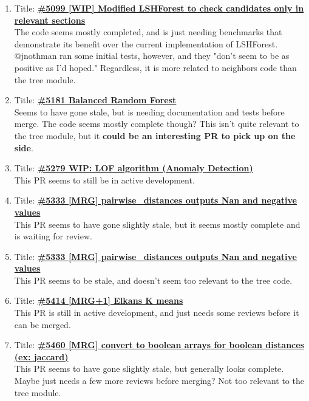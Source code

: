 \documentclass[12pt, oneside]{article}
\begin{document}
\begin{enumerate}
  \item
  Title:
  \textbf{\href{https://github.com/scikit-learn/scikit-learn/pull/5099}
    {\#5099 [WIP] Modified LSHForest to check candidates only in
      relevant sections}}\\
  The code seems mostly completed, and is just needing benchmarks that
  demonstrate its benefit over the current implementation of
  LSHForest. @jnothman ran some initial tests, however, and they
  "don't seem to be as positive as I'd hoped." Regardless, it is more
  related to neighbors code than the tree module.

  \item
  Title:
  \textbf{\href{https://github.com/scikit-learn/scikit-learn/pull/5181}
    {\#5181 Balanced Random Forest}}\\
  Seems to have gone stale, but is needing documentation and tests
  before merge. The code seems mostly complete though? This isn't
  quite relevant to the tree module, but it \textbf{could be an
    interesting PR to pick up on the side}.

  \item
  Title:
  \textbf{\href{https://github.com/scikit-learn/scikit-learn/pull/5279}
    {\#5279 WIP: LOF algorithm (Anomaly Detection)}}\\
  This PR seems to still be in active development.

  \item
  Title:
  \textbf{\href{https://github.com/scikit-learn/scikit-learn/pull/5333}
    {\#5333 [MRG] pairwise\_distances outputs Nan and negative values}}\\
  This PR seems to have gone slightly stale, but it seems mostly
  complete and is waiting for review.

  \item
  Title:
  \textbf{\href{https://github.com/scikit-learn/scikit-learn/pull/5382}
    {\#5333 [MRG] pairwise\_distances outputs Nan and negative values}}\\
  This PR seems to be stale, and doesn't seem too relevant to the tree code.

  \item
  Title:
  \textbf{\href{https://github.com/scikit-learn/scikit-learn/pull/5414}
    {\#5414 [MRG+1] Elkans K means}}\\
  This PR is still in active development, and just needs some reviews
  before it can be merged.

  \item
  Title:
  \textbf{\href{https://github.com/scikit-learn/scikit-learn/pull/5460}
    {\#5460 [MRG] convert to boolean arrays for boolean distances (ex: jaccard)}}\\
  This PR seems to have gone slightly stale, but generally looks
  complete. Maybe just needs a few more reviews before merging? Not
  too relevant to the tree module.


\end{enumerate}
\end{document}
